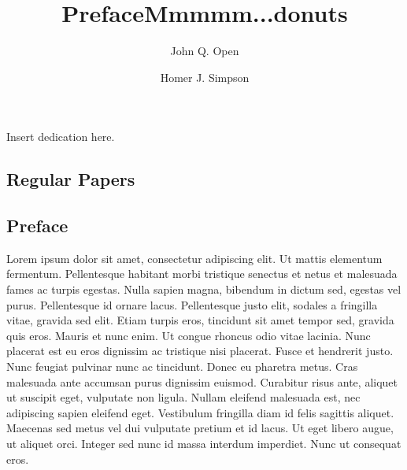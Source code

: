 \documentclass[a4paper,UKenglish]{oasicsmaster}
\begin{document}
\begin{dedication}%
  Insert dedication here.
\end{dedication}


\begin{contentslist}

\contitem
\title{Preface}
\author{John Q. Open}

\part{Regular Papers}

\contitem
\title{Mmmmm...donuts}
\author{Homer J. Simpson}


\end{contentslist}



\chapter{Preface}  %

Lorem ipsum dolor sit amet, consectetur adipiscing elit. Ut mattis
elementum fermentum. Pellentesque habitant morbi tristique senectus et
netus et malesuada fames ac turpis egestas. Nulla sapien magna,
bibendum in dictum sed, egestas vel purus. Pellentesque id ornare
lacus. Pellentesque justo elit, sodales a fringilla vitae, gravida sed
elit. Etiam turpis eros, tincidunt sit amet tempor sed, gravida quis
eros. Mauris et nunc enim. Ut congue rhoncus odio vitae lacinia. Nunc
placerat est eu eros dignissim ac tristique nisi placerat. Fusce et
hendrerit justo. Nunc feugiat pulvinar nunc ac tincidunt. Donec eu
pharetra metus. Cras malesuada ante accumsan purus dignissim
euismod. Curabitur risus ante, aliquet ut suscipit eget, vulputate non
ligula. Nullam eleifend malesuada est, nec adipiscing sapien eleifend
eget. Vestibulum fringilla diam id felis sagittis aliquet. Maecenas
sed metus vel dui vulputate pretium et id lacus. Ut eget libero augue,
ut aliquet orci. Integer sed nunc id massa interdum imperdiet. Nunc ut
consequat eros.
\end{document}
